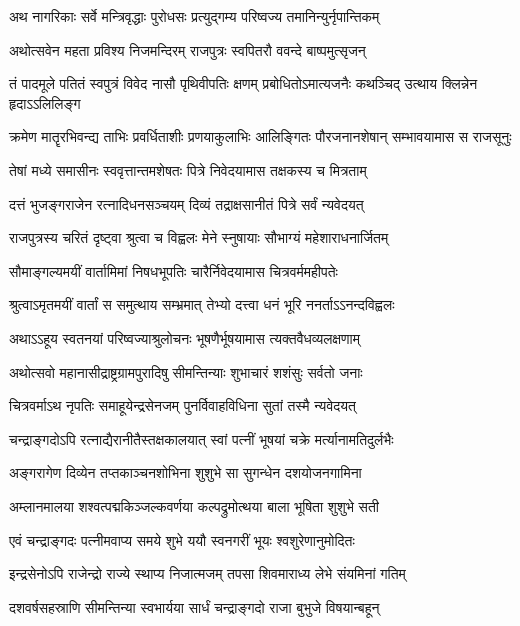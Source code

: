 \twolineshloka
{अथ नागरिकाः सर्वे मन्त्रिवृद्धाः पुरोधसः}
{प्रत्युद्गम्य परिष्वज्य तमानिन्युर्नृपान्तिकम्} %

\twolineshloka
{अथोत्सवेन महता प्रविश्य निजमन्दिरम्}
{राजपुत्रः स्वपितरौ ववन्दे बाष्पमुत्सृजन्} %

\fourlineindentedshloka
{तं पादमूले पतितं स्वपुत्रं}
{विवेद नासौ पृथिवीपतिः क्षणम्}
{प्रबोधितोऽमात्यजनैः कथञ्चिद्}
{उत्थाय क्लिन्नेन हृदाऽऽलिलिङ्ग} %

\fourlineindentedshloka
{क्रमेण मातॄरभिवन्द्य ताभिः}
{प्रवर्धिताशीः प्रणयाकुलाभिः}
{आलिङ्गितः पौरजनानशेषान्}
{सम्भावयामास स राजसूनुः} %

\twolineshloka
{तेषां मध्ये समासीनः स्ववृत्तान्तमशेषतः}
{पित्रे निवेदयामास तक्षकस्य च मित्रताम्} %

\twolineshloka
{दत्तं भुजङ्गराजेन रत्नादिधनसञ्चयम्}
{दिव्यं तद्राक्षसानीतं पित्रे सर्वं न्यवेदयत्} %

\twolineshloka
{राजपुत्रस्य चरितं दृष्ट्वा श्रुत्वा च विह्वलः}
{मेने स्नुषायाः सौभाग्यं महेशाराधनार्जितम्} %

\twolineshloka
{सौमाङ्गल्यमयीं वार्तामिमां निषधभूपतिः}
{चारैर्निवेदयामास चित्रवर्ममहीपतेः} %

\twolineshloka
{श्रुत्वाऽमृतमयीं वार्तां स समुत्थाय सम्भ्रमात्}
{तेभ्यो दत्त्वा धनं भूरि ननर्ताऽऽनन्दविह्वलः} %

\twolineshloka
{अथाऽऽहूय स्वतनयां परिष्वज्याश्रुलोचनः}
{भूषणैर्भूषयामास त्यक्तवैधव्यलक्षणाम्} %

\twolineshloka
{अथोत्सवो महानासीद्राष्ट्रग्रामपुरादिषु}
{सीमन्तिन्याः शुभाचारं शशंसुः सर्वतो जनाः} %

\twolineshloka
{चित्रवर्माऽथ नृपतिः समाहूयेन्द्रसेनजम्}
{पुनर्विवाहविधिना सुतां तस्मै न्यवेदयत्} %

\twolineshloka
{चन्द्राङ्गदोऽपि रत्नाद्यैरानीतैस्तक्षकालयात्}
{स्वां पत्नीं भूषयां चक्रे मर्त्यानामतिदुर्लभैः} %

\twolineshloka
{अङ्गरागेण दिव्येन तप्तकाञ्चनशोभिना}
{शुशुभे सा सुगन्धेन दशयोजनगामिना} %

\twolineshloka
{अम्लानमालया शश्वत्पद्मकिञ्जल्कवर्णया}
{कल्पद्रुमोत्थया बाला भूषिता शुशुभे सती} %

\twolineshloka
{एवं चन्द्राङ्गदः पत्नीमवाप्य समये शुभे}
{ययौ स्वनगरीं भूयः श्वशुरेणानुमोदितः} %

\twolineshloka
{इन्द्रसेनोऽपि राजेन्द्रो राज्ये स्थाप्य निजात्मजम्}
{तपसा शिवमाराध्य लेभे संयमिनां गतिम्} %

\twolineshloka
{दशवर्षसहस्राणि सीमन्तिन्या स्वभार्यया}
{सार्धं चन्द्राङ्गदो राजा बुभुजे विषयान्बहून्} %


